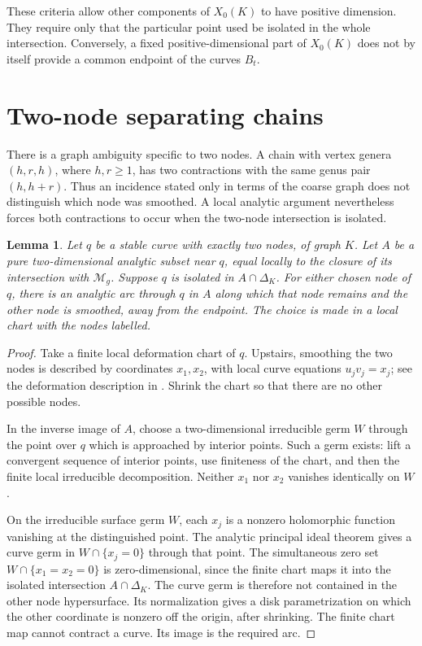 \documentclass[11pt]{article}
\newcommand{\M}{\mathcal M}
\newtheorem{lemma}[theorem]{Lemma}
\theoremstyle{definition}
\theoremstyle{remark}
\begin{document}
These criteria allow other components of $X_0(K)$ to have positive dimension. They require only that the particular point used be isolated in the whole intersection. Conversely, a fixed positive-dimensional part of $X_0(K)$ does not by itself provide a common endpoint of the curves $B_t$.

\section{Two-node separating chains}\label{sec:two}

There is a graph ambiguity specific to two nodes. A chain with vertex genera $(h,r,h)$, where $h,r\geq1$, has two contractions with the same genus pair $(h,h+r)$. Thus an incidence stated only in terms of the coarse graph does not distinguish which node was smoothed. A local analytic argument nevertheless forces both contractions to occur when the two-node intersection is isolated.

\begin{lemma}\label{lem:two-node}
Let $q$ be a stable curve with exactly two nodes, of graph $K$. Let $A$ be a pure two-dimensional analytic subset near $q$, equal locally to the closure of its intersection with $\M_g$. Suppose $q$ is isolated in $A\cap\Delta_K$. For either chosen node of $q$, there is an analytic arc through $q$ in $A$ along which that node remains and the other node is smoothed, away from the endpoint. The choice is made in a local chart with the nodes labelled.
\end{lemma}

\begin{proof}
Take a finite local deformation chart of $q$. Upstairs, smoothing the two nodes is described by coordinates $x_1,x_2$, with local curve equations $u_jv_j=x_j$; see the deformation description in \cite[proof of Proposition~3.7, p.~174]{EF}. Shrink the chart so that there are no other possible nodes.

In the inverse image of $A$, choose a two-dimensional irreducible germ $W$ through the point over $q$ which is approached by interior points. Such a germ exists: lift a convergent sequence of interior points, use finiteness of the chart, and then the finite local irreducible decomposition. Neither $x_1$ nor $x_2$ vanishes identically on $W$.

On the irreducible surface germ $W$, each $x_j$ is a nonzero holomorphic function vanishing at the distinguished point. The analytic principal ideal theorem gives a curve germ in $W\cap\{x_j=0\}$ through that point. The simultaneous zero set $W\cap\{x_1=x_2=0\}$ is zero-dimensional, since the finite chart maps it into the isolated intersection $A\cap\Delta_K$. The curve germ is therefore not contained in the other node hypersurface. Its normalization gives a disk parametrization on which the other coordinate is nonzero off the origin, after shrinking. The finite chart map cannot contract a curve. Its image is the required arc.
\end{proof}
\end{document}
